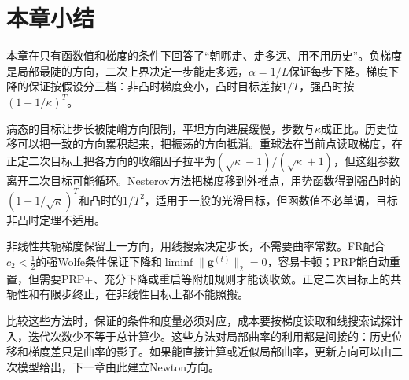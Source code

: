 \section{本章小结}
\label{sec:fom-summary}

本章在只有函数值和梯度的条件下回答了“朝哪走、走多远、用不用历史”。负梯度是局部最陡的方向，二次上界决定一步能走多远，$\alpha=1/L$保证每步下降。梯度下降的保证按假设分三档：非凸时梯度变小，凸时目标差按$1/T$，强凸时按$(1-1/\kappa)^T$。

病态的目标让步长被陡峭方向限制，平坦方向进展缓慢，步数与$\kappa$成正比。历史位移可以把一致的方向累积起来，把振荡的方向抵消。重球法在当前点读取梯度，在正定二次目标上把各方向的收缩因子拉平为$(\sqrt\kappa-1)/(\sqrt\kappa+1)$，但这组参数离开二次目标可能循环。Nesterov方法把梯度移到外推点，用势函数得到强凸时的$(1-1/\sqrt\kappa)^T$和凸时的$1/T^2$，适用于一般的光滑目标，但函数值不必单调，目标非凸时定理不适用。

非线性共轭梯度保留上一方向，用线搜索决定步长，不需要曲率常数。FR配合$c_2<\tfrac12$的强Wolfe条件保证下降和$\liminf\lVert\bm{g}^{(t)}\rVert_2=0$，容易卡顿；PRP能自动重置，但需要PRP+、充分下降或重启等附加规则才能谈收敛。正定二次目标上的共轭性和有限步终止，在非线性目标上都不能照搬。

比较这些方法时，保证的条件和度量必须对应，成本要按梯度读取和线搜索试探计入，迭代次数少不等于总计算少。这些方法对局部曲率的利用都是间接的：历史位移和梯度差只是曲率的影子。如果能直接计算或近似局部曲率，更新方向可以由二次模型给出，下一章由此建立Newton方向。
